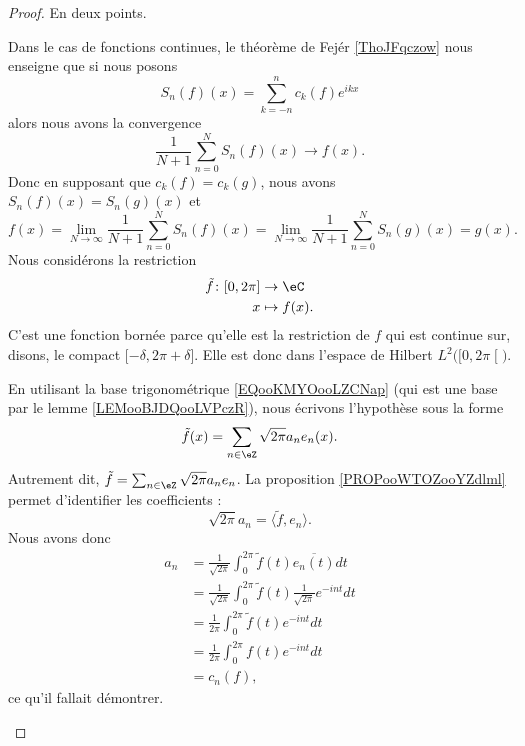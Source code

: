 \begin{proof}
	En deux points.
	\begin{subproof}
		Dans le cas de fonctions continues, le théorème de Fejér \ref{ThoJFqczow} nous enseigne que si nous posons
		\begin{equation}
			S_n(f)(x)=\sum_{k=-n}^{n}c_k(f) e^{ikx}
		\end{equation}
		alors nous avons la convergence
		\begin{equation}
			\frac{1}{ N+1 }\sum_{n=0}^NS_n(f)(x)\to f(x).
		\end{equation}
		Donc en supposant que \( c_k(f)=c_k(g)\), nous avons \( S_n(f)(x)=S_n(g)(x)\) et
		\begin{equation}
			f(x)=\lim_{N\to \infty} \frac{1}{ N+1 }\sum_{n=0}^NS_n(f)(x)=\lim_{N\to \infty} \frac{1}{ N+1 }\sum_{n=0}^NS_n(g)(x)=g(x).
		\end{equation}
		Nous considérons la restriction
		\begin{equation}
			\begin{aligned}
				\tilde f\colon \mathopen[ 0 , 2\pi \mathclose] & \to \eC       \\
				x                                              & \mapsto f(x).
			\end{aligned}
		\end{equation}
		C'est une fonction bornée parce qu'elle est la restriction de \( f\) qui est continue sur, disons, le compact \( \mathopen[ -\delta , 2\pi+\delta \mathclose]\). Elle est donc dans l'espace de Hilbert \( L^2\big( \mathopen[ 0 , 2\pi \mathclose[ \big)\).

		En utilisant la base trigonométrique \eqref{EQooKMYOooLZCNap} (qui est une base par le lemme \ref{LEMooBJDQooLVPczR}), nous écrivons l'hypothèse sous la forme
		\begin{equation}
			\tilde f(x)=\sum_{n\in \eZ}\sqrt{ 2\pi }a_ne_n(x).
		\end{equation}
		Autrement dit, \( \tilde f=\sum_{n\in \eZ}\sqrt{ 2\pi }a_ne_n\). La proposition \ref{PROPooWTOZooYZdlml} permet d'identifier les coefficients :
		\begin{equation}
			\sqrt{ 2\pi }a_n=\langle \tilde f, e_n\rangle .
		\end{equation}
		Nous avons donc
		\begin{subequations}
			\begin{align}
				a_n & =\frac{1}{ \sqrt{ 2\pi } }\int_0^{2\pi}\tilde f(t)\overline{ e_n(t) }dt                \\
				    & =\frac{1}{ \sqrt{ 2\pi } }\int_0^{2\pi}\tilde f(t)\frac{1}{ \sqrt{ 2\pi } } e^{-int}dt \\
				    & =\frac{1}{ 2\pi }\int_0^{2\pi}\tilde f(t) e^{-int}dt                                   \\
				    & =\frac{1}{ 2\pi }\int_0^{2\pi}f(t) e^{-int}dt                                          \\
				    & =c_n(f),
			\end{align}
		\end{subequations}
		ce qu'il fallait démontrer.
	\end{subproof}
\end{proof}

